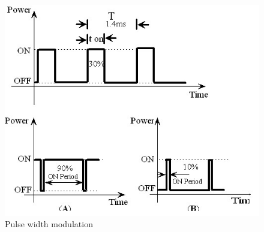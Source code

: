\documentclass[a4paper,12pt,oneside]{book}
\begin{document}
	\begin{figure}[h!]
		\includegraphics[width=\textwidth]{./HardwareManual/pwm.png}
		\caption{Pulse width modulation}
	\end{figure}
\end{document}
